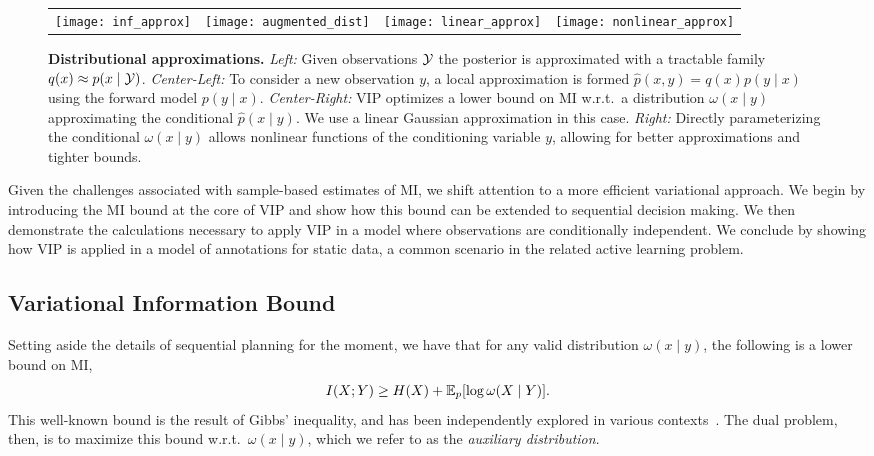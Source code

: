 \begin{figure*}[t]
  \centering
  \begin{tabular}{cccc}
    \hspace{-9mm}\texttt{[image: inf\_approx]} &
    \hspace{-9mm}\texttt{[image: augmented\_dist]} &
    \hspace{-9mm}\texttt{[image: linear\_approx]} &
    \hspace{-9mm}\texttt{[image: nonlinear\_approx]}
  \end{tabular}

  \caption{\small \textbf{Distributional approximations.} \emph{Left:}
  Given observations $\mathcal{Y}$ the posterior is approximated with a
  tractable family $q(x) \approx p(x\mid \mathcal{Y})$.  \emph{Center-Left:}
  To consider a new observation $y$, a local approximation is formed
  $\hat{p}(x,y) = q(x) p(y \mid x)$ using the forward model $p(y\mid
  x)$.  \emph{Center-Right:} VIP optimizes a lower bound on MI
  w.r.t.~a distribution $\omega(x\mid y)$ approximating the
  conditional $\hat{p}(x\mid y)$. We use a linear Gaussian
  approximation in this case.  \emph{Right:} Directly parameterizing
  the conditional $\omega(x\mid y)$ allows nonlinear functions of the
  conditioning variable $y$, allowing for better approximations and
  tighter bounds.}

  \label{fig:approx}
\end{figure*}

Given the challenges associated with sample-based estimates of MI, we
shift attention to a more efficient variational approach.  We begin by
introducing the MI bound at the core of VIP and show how this bound
can be extended to sequential decision making.  We then demonstrate
the calculations necessary to apply VIP in a model where observations
are conditionally independent.  We conclude by showing how VIP is
applied in a model of annotations for static data, a common scenario
in the related active learning problem.

\subsection{Variational Information Bound}
Setting aside the details of sequential planning for the moment, we
have that for any valid distribution ${\omega(x\mid y)}$, the following
is a lower bound on MI,
\begin{equation}\label{eq:varmi}
  I(X;Y) \geq H(X) + \mathbb{E}_p[ \log \omega(X\mid Y) ].
\end{equation}
This well-known bound is the result of Gibbs' inequality, and has been
independently explored in various contexts~\citep{agakov2004algorithm,
  mohamed2015variational, gao2016variational, chen2018learning}.  The
dual problem, then, is to maximize this bound w.r.t.~${\omega(x\mid
  y)}$, which we refer to as the \emph{auxiliary distribution}.


